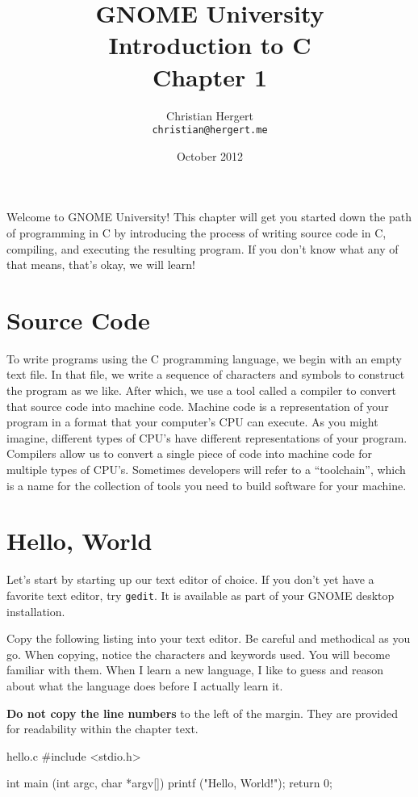 \documentclass[12pt]{article}
\title{GNOME University \\
Introduction to C \\
Chapter 1}
\author{Christian Hergert \\
    \small \texttt{christian@hergert.me}
}
\date{October 2012}
\begin{document}
\maketitle

Welcome to GNOME University! This chapter will get you started down the path of
programming in C by introducing the process of writing source code in C,
compiling, and executing the resulting program. If you don't know what any of
that means, that's okay, we will learn!

\section{Source Code}

To write programs using the C programming language, we begin with an empty text
file. In that file, we write a sequence of characters and symbols to construct
the program as we like. After which, we use a tool called a compiler to convert
that source code into machine code. Machine code is a representation of your
program in a format that your computer's CPU can execute. As you might imagine,
different types of CPU's have different representations of your program. Compilers
allow us to convert a single piece of code into machine code for multiple types
of CPU's. Sometimes developers will refer to a ``toolchain'', which is a name
for the collection of tools you need to build software for your machine.

\section{Hello, World}

Let's start by starting up our text editor of choice. If you don't yet have a
favorite text editor, try \verb|gedit|. It is available as part of your GNOME
desktop installation.

Copy the following listing into your text editor. Be careful and methodical as
you go. When copying, notice the characters and keywords used.  You will become
familiar with them. When I learn a new language, I like to guess and reason
about what the language does before I actually learn it.

\textbf{Do not copy the line numbers} to the left of the margin. They are
provided for readability within the chapter text.

\begin{code}{hello.c}
#include <stdio.h>

int
main (int   argc,
      char *argv[])
{
    printf ("Hello, World!\n");
    return 0;
}
\end{code}
\end{document}
